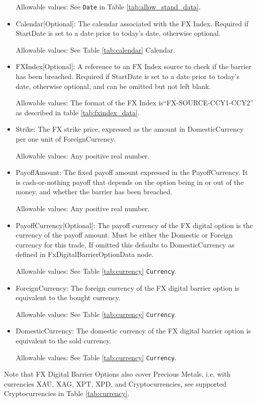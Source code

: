 \begin{itemize}
Allowable values:  See \lstinline!Date! in Table \ref{tab:allow_stand_data}.

\item Calendar[Optional]: The calendar associated with the FX Index. Required if StartDate is set to a date prior to today's date, otherwise optional.

Allowable values: See Table \ref{tab:calendar} Calendar.

\item FXIndex[Optional]: A reference to an FX Index source to check if the barrier has been breached. Required if StartDate is set to a date prior to today's date, otherwise optional, and can be omitted but not left blank.

Allowable values:  The format of the FX Index is``FX-SOURCE-CCY1-CCY2'' as described in table \ref{tab:fxindex_data}.  

\item Strike: The FX strike price, expressed as the amount in DomesticCurrency per one unit of ForeignCurrency. 

Allowable values:  Any positive real number.

\item PayoffAmount: The fixed payoff amount expressed in the PayoffCurrency. It is cash-or-nothing payoff that depends on the option being in or out of the money, and whether the barrier has been breached.

Allowable values:  Any positive real number.

\item PayoffCurrency[Optional]: The payoff currency of the FX digital option is the currency of the payoff amount. Must be either the Domestic or Foreign currency for this trade, If omitted this defaults to DomesticCurrency as defined in FxDigitalBarrierOptionData node.

Allowable values:  See Table \ref{tab:currency} \lstinline!Currency!.

\item ForeignCurrency: The foreign currency of the FX digital barrier option is equivalent to the bought currency.  

Allowable values:  See Table \ref{tab:currency} \lstinline!Currency!.

\item DomesticCurrency: The domestic currency of the FX digital barrier option is equivalent to the sold currency. 

Allowable values:  See Table \ref{tab:currency} \lstinline!Currency!.

\end{itemize}

Note that FX Digital Barrier Options also cover Precious Metals, i.e. with
currencies XAU, XAG, XPT, XPD, and Cryptocurrencies,  see supported Cryptocurrencies in Table \ref{tab:currency}.